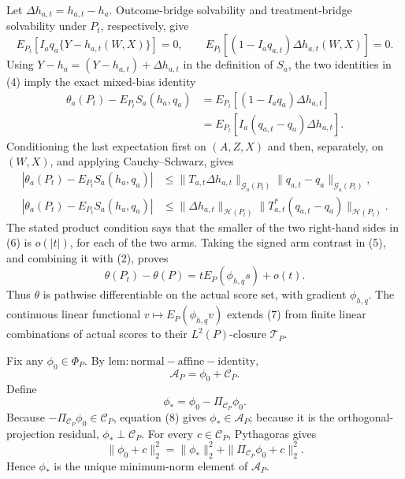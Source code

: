 Let \(\Delta h_{a,t}=h_{a,t}-h_a\).  Outcome-bridge solvability and treatment-bridge solvability under \(P_t\), respectively, give
\[
 E_{P_t}[I_aq_a\{Y-h_{a,t}(W,X)\}]=0,
 \qquad
 E_{P_t}[(1-I_aq_{a,t})\Delta h_{a,t}(W,X)]=0.                       \tag{4}
\]
Using \(Y-h_a=(Y-h_{a,t})+\Delta h_{a,t}\) in the definition of \(S_a\), the two identities in (4) imply the exact mixed-bias identity
\[
 \begin{aligned}
 \theta_a(P_t)-E_{P_t}S_a(h_a,q_a)
 &=E_{P_t}[(1-I_aq_a)\Delta h_{a,t}]\\
 &=E_{P_t}[I_a(q_{a,t}-q_a)\Delta h_{a,t}].                         \tag{5}
 \end{aligned}
\]
Conditioning the last expectation first on \((A,Z,X)\) and then, separately, on \((W,X)\), and applying Cauchy--Schwarz, gives
\[
 \begin{aligned}
 |\theta_a(P_t)-E_{P_t}S_a(h_a,q_a)|
 &\le
 \|T_{a,t}\Delta h_{a,t}\|_{\mathcal G_a(P_t)}
 \|q_{a,t}-q_a\|_{\mathcal G_a(P_t)},\\
 |\theta_a(P_t)-E_{P_t}S_a(h_a,q_a)|
 &\le
 \|\Delta h_{a,t}\|_{\mathcal H(P_t)}
 \|T_{a,t}^*(q_{a,t}-q_a)\|_{\mathcal H(P_t)}.                    \tag{6}
 \end{aligned}
\]
The stated product condition says that the smaller of the two right-hand sides in (6) is \(o(|t|)\), for each of the two arms.  Taking the signed arm contrast in (5), and combining it with (2), proves
\[
 \theta(P_t)-\theta(P)=tE_P(\phi_{h,q}s)+o(t).                      \tag{7}
\]
Thus \(\theta\) is pathwise differentiable on the actual score set, with gradient \(\phi_{h,q}\).  The continuous linear functional \(v\mapsto E_P(\phi_{h,q}v)\) extends (7) from finite linear combinations of actual scores to their \(L^2(P)\)-closure \(\mathcal T_P\).

Fix any \(\phi_0\in\Phi_P\).  By \(\mathrm{lem:normal-affine-identity}\),
\[
 \mathcal A_P=\phi_0+\mathcal C_P.                                 \tag{8}
\]
Define
\[
 \phi_* =\phi_0-\Pi_{\mathcal C_P}\phi_0.
\]
Because \(-\Pi_{\mathcal C_P}\phi_0\in\mathcal C_P\), equation (8) gives \(\phi_*\in\mathcal A_P\); because it is the orthogonal-projection residual, \(\phi_*\perp\mathcal C_P\).  For every \(c\in\mathcal C_P\), Pythagoras gives
\[
 \|\phi_0+c\|_2^2
 =\|\phi_*\|_2^2+\|\Pi_{\mathcal C_P}\phi_0+c\|_2^2.           \tag{9}
\]
Hence \(\phi_*\) is the unique minimum-norm element of \(\mathcal A_P\).

